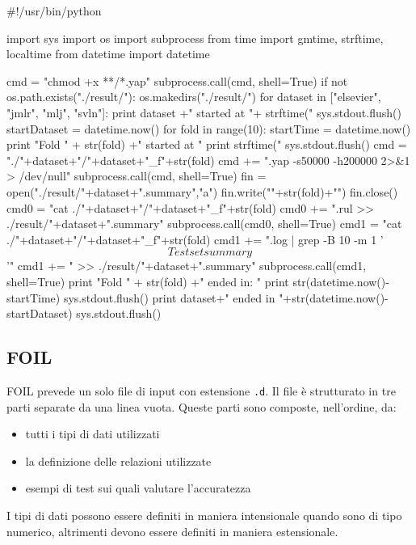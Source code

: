 \begin{pythoncode}
#!/usr/bin/python

import sys
import os
import subprocess
from time import gmtime, strftime, localtime
from datetime import datetime

cmd = "chmod +x **/*.yap"
subprocess.call(cmd, shell=True)
if not os.path.exists("./result/"):
    os.makedirs("./result/")
for dataset in ["elsevier", "jmlr", "mlj", "svln"]:
    print dataset +" started at "+ strftime("%
    sys.stdout.flush()
    startDataset = datetime.now()
    for fold in range(10):
        startTime = datetime.now()
        print "Fold " + str(fold) +" started at "
        print strftime("%
        sys.stdout.flush()
        cmd = "./"+dataset+"/"+dataset+"_f"+str(fold)
        cmd += ".yap -s50000 -h200000 2>&1 > /dev/null"
        subprocess.call(cmd, shell=True)
        fin = open("./result/"+dataset+".summary","a")
        fin.write("\nFold "+str(fold)+"\n")
        fin.close()
        cmd0 = "cat ./"+dataset+"/"+dataset+"_f"+str(fold)
        cmd0 += ".rul >> ./result/"+dataset+".summary"
        subprocess.call(cmd0, shell=True)
        cmd1 = "cat ./"+dataset+"/"+dataset+"_f"+str(fold)
        cmd1 += ".log | grep -B 10 -m 1 '\[Test set summary\]'"
        cmd1 += " >> ./result/"+dataset+".summary"
        subprocess.call(cmd1, shell=True)
        print "Fold " + str(fold) +" ended in: "
        print str(datetime.now()-startTime)
        sys.stdout.flush()
    print dataset+" ended in "+str(datetime.now()-startDataset)
    sys.stdout.flush()
\end{pythoncode}

\subsection{FOIL}
FOIL prevede un solo file di input con estensione \verb+.d+.
Il file è strutturato in tre
parti separate da una linea vuota. Queste parti sono composte, nell'ordine, da:
\begin{itemize}
\item tutti i tipi di dati utilizzati
\item la definizione delle relazioni utilizzate
\item esempi di test sui quali valutare l'accuratezza
\end{itemize}

I tipi di dati possono essere definiti in maniera
intensionale quando sono di tipo numerico, altrimenti devono essere definiti in maniera estensionale. 
